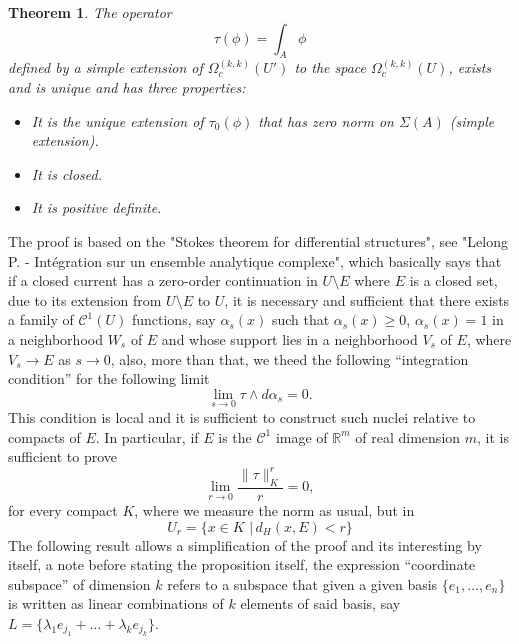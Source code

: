 \documentclass[12pt,twoside,a4paper]{report}
\newtheorem{theorem}{Theorem}[section]
\newcommand{\re}{\ensuremath{\mathbb R }}
\newcommand{\om}{\ensuremath{\Omega}}
\newcommand{\sig}{\ensuremath{\Sigma}}
\newcommand{\csheaf}{\ensuremath{\mathcal C }}
\begin{document}
\begin{theorem}
The operator
\[
    \tau(\phi)=\int_A\phi
\]
defined by a simple extension of $\om_c^{(k,k)}(U')$ to the space $\om_c^{(k,k)}(U)$, exists and is unique and has three properties:
\begin{itemize}
    \item[a)] It is the unique extension of $\tau_0(\phi)$ that has zero norm on $\sig(A)$ (simple extension).
    \item[b)] It is closed.
    \item[c)] It is positive definite.
\end{itemize}
\end{theorem}

\noindent The proof is based on the "Stokes theorem for differential structures", see "Lelong P. - Intégration sur un ensemble analytique complexe", which basically says that if a closed current has a zero-order continuation in $U\setminus E$ where $E$ is a closed set, due to its extension from $U\setminus E$ to $U$, it is necessary and sufficient that there exists a family of $\csheaf^{1}(U)$ functions, say $\alpha_s(x)$ such that $\alpha_s(x)\geq0$, $\alpha_s(x)=1$ in a neighborhood $W_s$ of $E$ and whose support lies in a neighborhood $V_s$ of $E$, where $V_s\rightarrow E$ as $s\rightarrow 0$, also, more than that, we theed the following ``integration condition'' for the following limit
\[
    \lim_{s\rightarrow 0}\tau\wedge d\alpha_s=0.
\]
This condition is local and it is sufficient to construct such nuclei relative to compacts of $E$. In particular, if $E$ is the $\csheaf^1$ image of $\re^m$ of real dimension $m$, it is sufficient to prove
\[
    \lim_{r\rightarrow 0}\frac{\|\tau\|^{r}_K}{r}=0,
\]
for every compact $K$, where we measure the norm as usual, but in
\[
 U_r=\{x\in K\,\,\vert\,d_H(x,E)<r\}
\]
The following result allows a simplification of the proof and its interesting by itself, a note before stating the proposition itself, the expression ``coordinate subspace'' of dimension $k$ refers to a subspace that given a given basis $\{e_1,\dots,e_n\}$ is written as linear combinations of $k$ elements of said basis, say \hbox{$L=\{\lambda_1e_{j_1}+\dots+\lambda_ke_{j_k}\}$}.
\end{document}
